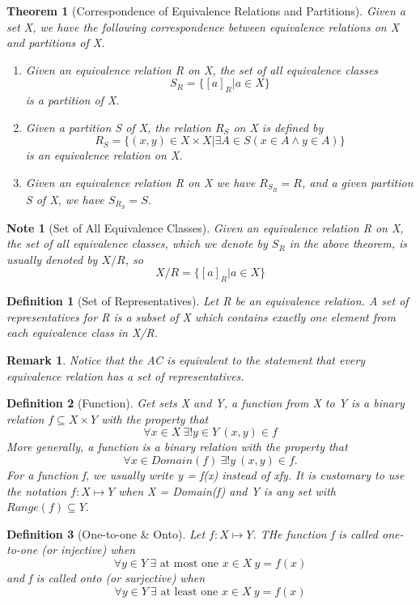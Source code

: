 \documentclass[11pt, oneside]{book}
\theoremstyle{break}
\newtheorem{thm}{Theorem}[section]
\newtheorem*{remark}{Remark}
\newtheorem*{note}{Note}
\newtheorem{defn}{Definition}[section]
\begin{document}
\begin{thm}[Correspondence of Equivalence Relations and Partitions]
	Given a set X, we have the following correspondence between equivalence relations on X and partitions of X.
	\begin{enumerate}
		\item Given an equivalence relation R on X, the set of all equivalence classes
		\[
			S_R = \{[a]_R | a \in X\}
		\] is a partition of X.
		\item Given a partition S of X, the relation $R_S$ on X is defined by
		\[
			R_S = \{(x, y) \in X \times X | \exists A \in S (x \in A \land y \in A)\}
		\] is an equivalence relation on X.
		\item Given an equivalence relation R on X we have $R_{S_R} = R$, and a given partition S of X, we have $S_{R_S} = S$.
	\end{enumerate}
\end{thm}

\begin{note}[Set of All Equivalence Classes]
	Given an equivalence relation R on X, the set of all equivalence classes, which we denote by $S_R$ in the above theorem, is usually denoted by $X/R$, so
	\[
		X/R = \{[a]_R | a \in X\}
	\]
\end{note}

\begin{defn}[Set of Representatives]
	Let R be an equivalence relation. A set of representatives for R is a subset of X which contains exactly one element from each equivalence class in X/R.
\end{defn}

\begin{remark}
	Notice that the AC is equivalent to the statement that every equivalence relation has a set of representatives.
\end{remark}

\begin{defn}[Function]
	Get sets X and Y, a function from X to Y is a binary relation $f \subseteq X \times Y$ with the property that
	\[
		\forall x \in X \> \exists! y \in Y \> (x,y) \in f
	\]
	More generally, a function is a binary relation with the property that
	\[
		\forall x \in Domain(f) \> \exists! y \> (x, y) \in f.
	\]
	For a function f, we usually write y = f(x) instead of xfy. It is customary to use the notation $f: X \mapsto Y$ when X = Domain(f) and Y is any set with $Range(f) \subseteq Y$.
\end{defn}

\begin{defn}[One-to-one \& Onto]
	Let $f: X \mapsto Y$. THe function f is called one-to-one (or injective) when
	\[
		\forall y \in Y \> \exists \text{ at most one } x \in X \> y = f(x)
	\]
	and f is called onto (or surjective) when
	\[
		\forall y \in Y \> \exists \text{ at least one } x \in X \> y = f(x)
	\]
\end{defn}
\end{document}
